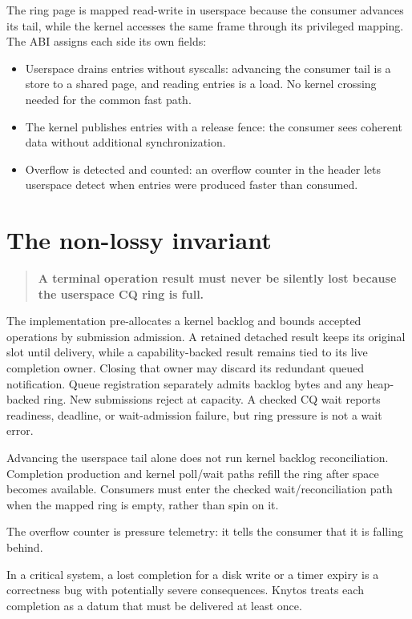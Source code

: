 The ring page is mapped read-write in userspace because the consumer advances its
tail, while the kernel accesses the same frame through its privileged mapping. The ABI
assigns each side its own fields:

\begin{itemize}
    \item Userspace drains entries without syscalls: advancing the
        consumer tail is a store to a shared page, and reading entries is a load.
        No kernel crossing needed for the common fast path.
    \item The kernel publishes entries with a release fence: the consumer
        sees coherent data without additional synchronization.
    \item Overflow is detected and counted: an overflow counter in the
        header lets userspace detect when entries were produced faster than
        consumed.
\end{itemize}

\section{The non-lossy invariant}

\begin{quote}
\textbf{A terminal operation result must never be silently lost because the
userspace CQ ring is full.}
\end{quote}

The implementation pre-allocates a kernel backlog and bounds accepted operations
by submission admission. A retained detached result keeps its original slot
until delivery, while a capability-backed result remains tied to its live completion
owner. Closing that owner may discard its redundant queued notification.
Queue registration separately admits backlog bytes and any heap-backed ring.
New submissions reject at capacity. A checked CQ wait reports readiness,
deadline, or wait-admission failure, but ring pressure is not a wait error.

Advancing the userspace tail alone does not run kernel backlog reconciliation.
Completion production and kernel poll/wait paths refill the ring after space
becomes available. Consumers must enter the checked wait/reconciliation path
when the mapped ring is empty, rather than spin on it.

The overflow counter is pressure telemetry: it tells the consumer that it is
falling behind.

In a critical system, a lost completion for a disk write or a timer
expiry is a correctness bug with potentially severe consequences. Knytos
treats each completion as a datum that must be delivered at least once.

